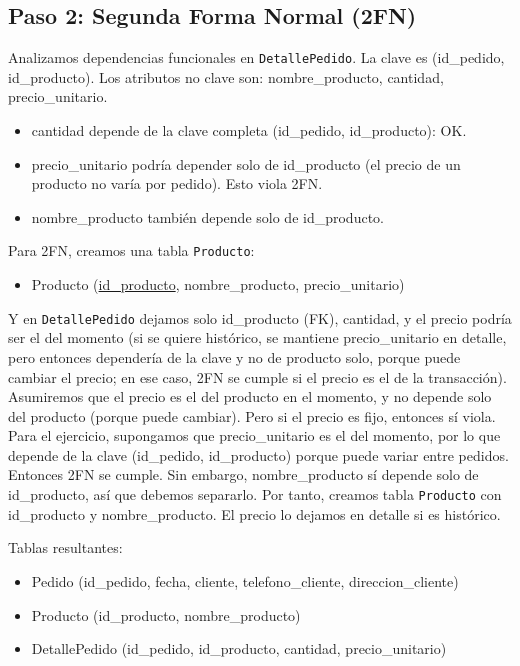 \documentclass[12pt,a4paper,openany,oneside]{book}
\begin{document}
\subsection{Paso 2: Segunda Forma Normal (2FN)}
Analizamos dependencias funcionales en \texttt{DetallePedido}. La clave es (id\_pedido, id\_producto). Los atributos no clave son: nombre\_producto, cantidad, precio\_unitario.
\begin{itemize}
    \item cantidad depende de la clave completa (id\_pedido, id\_producto): OK.
    \item precio\_unitario podría depender solo de id\_producto (el precio de un producto no varía por pedido). Esto viola 2FN.
    \item nombre\_producto también depende solo de id\_producto.
\end{itemize}
Para 2FN, creamos una tabla \texttt{Producto}:
\begin{itemize}
    \item Producto (\underline{id\_producto}, nombre\_producto, precio\_unitario)
\end{itemize}
Y en \texttt{DetallePedido} dejamos solo id\_producto (FK), cantidad, y el precio podría ser el del momento (si se quiere histórico, se mantiene precio\_unitario en detalle, pero entonces dependería de la clave y no de producto solo, porque puede cambiar el precio; en ese caso, 2FN se cumple si el precio es el de la transacción). Asumiremos que el precio es el del producto en el momento, y no depende solo del producto (porque puede cambiar). Pero si el precio es fijo, entonces sí viola. Para el ejercicio, supongamos que precio\_unitario es el del momento, por lo que depende de la clave (id\_pedido, id\_producto) porque puede variar entre pedidos. Entonces 2FN se cumple. Sin embargo, nombre\_producto sí depende solo de id\_producto, así que debemos separarlo.
Por tanto, creamos tabla \texttt{Producto} con id\_producto y nombre\_producto. El precio lo dejamos en detalle si es histórico.

Tablas resultantes:
\begin{itemize}
    \item Pedido (id\_pedido, fecha, cliente, telefono\_cliente, direccion\_cliente)
    \item Producto (id\_producto, nombre\_producto)
    \item DetallePedido (id\_pedido, id\_producto, cantidad, precio\_unitario)
\end{itemize}
\end{document}
